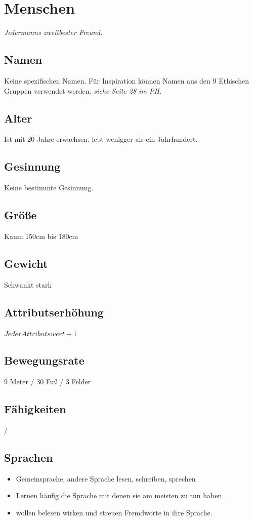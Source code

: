 %

\newpage
\section{Menschen}

\textit{Jedermanns zweitbester Freund.}

\subsection*{Namen}
Keine spezifischen Namen. Für Inspiration können Namen aus den 9 Ethischen Gruppen verwendet werden. \textit{siehe Seite 28 im PH.}

\subsection*{Alter}
Ist mit 20 Jahre erwachsen. lebt wenigger als ein Jahrhundert.

\subsection*{Gesinnung}
Keine bestimmte Gesinnung.

\subsection*{Größe}
Kaum 150cm bis 180cm

\subsection*{Gewicht}
Schwankt stark

\subsection*{Attributserhöhung}
$Jeder Attributswert + 1$

\subsection*{Bewegungsrate}
9 Meter / 30 Fuß / 3 Felder

\subsection*{Fähigkeiten}
/

\subsection*{Sprachen}
\begin{itemize}
	\item Gemeinsprache, andere Sprache
	\subitem lesen, schreiben, sprechen
	\item Lernen häufig die Sprache mit denen sie am meisten zu tun haben.
	\item wollen belesen wirken und streuen Fremdworte in ihre Sprache.
\end{itemize}

